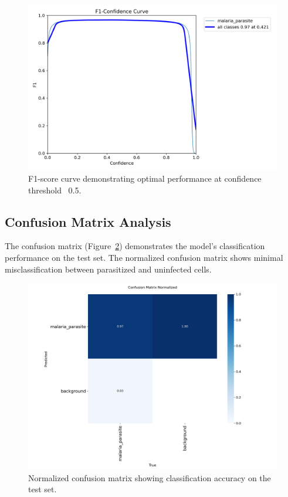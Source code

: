 \documentclass[10pt,twocolumn]{article}
\begin{document}
\begin{figure}[H]
\centering
\includegraphics[width=\columnwidth]{malaria_detection_training_output/results/BoxF1_curve.png}
\caption{F1-score curve demonstrating optimal performance at confidence threshold ~0.5.}
\label{fig:f1_curve}
\end{figure}

\subsection{Confusion Matrix Analysis}

The confusion matrix (Figure~\ref{fig:confusion_matrix}) demonstrates the model's classification performance on the test set. The normalized confusion matrix shows minimal misclassification between parasitized and uninfected cells.

\begin{figure}[H]
\centering
\includegraphics[width=0.8\columnwidth]{malaria_detection_training_output/results/confusion_matrix_normalized.png}
\caption{Normalized confusion matrix showing classification accuracy on the test set.}
\label{fig:confusion_matrix}
\end{figure}
\end{document}
